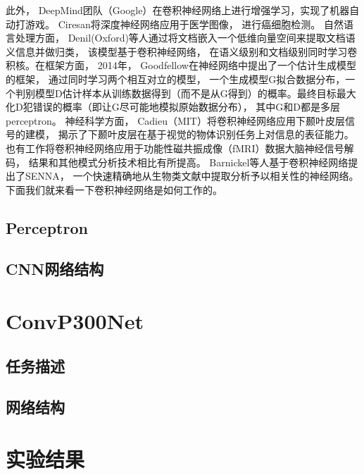 此外， DeepMind团队（Google）\cite{mnih2013playing}在卷积神经网络上进行增强学习，实现了机器自动打游戏。 Ciresan\cite{ciresan2013mitosis}将深度神经网络应用于医学图像， 进行癌细胞检测。  自然语言处理方面， Denil(Oxford)等人通过将文档嵌入一个低维向量空间来提取文档语义信息并做归类，  该模型基于卷积神经网络， 在语义级别和文档级别同时学习卷积核。在框架方面， 2014年， Goodfellow在神经网络中提出了一个估计生成模型的框架\cite{goodfellow2014generative}， 通过同时学习两个相互对立的模型， 一个生成模型G拟合数据分布，一个判别模型D估计样本从训练数据得到（而不是从G得到）的概率。最终目标最大化D犯错误的概率（即让G尽可能地模拟原始数据分布）， 其中G和D都是多层perceptron。 神经科学方面， Cadieu（MIT）将卷积神经网络应用下颞叶皮层信号的建模\cite{cadieu2014deep}， 揭示了下颞叶皮层在基于视觉的物体识别任务上对信息的表征能力。 也有工作将卷积神经网络应用于功能性磁共振成像（fMRI）数据大脑神经信号解码\cite{firat2014learning}， 结果和其他模式分析技术相比有所提高。 Barnickel等人基于卷积神经网络提出了SENNA， 一个快速精确地从生物类文献中提取分析予以相关性的神经网络\cite{barnickel2009large}。下面我们就来看一下卷积神经网络是如何工作的。


\subsection{Perceptron}

\subsection{CNN网络结构}\label{sec:cnn_arch}


\section{ConvP300Net}\label{sec:cnn_configure}

\subsection{任务描述}

\subsection{网络结构}

\section{实验结果}\label{sec:cnn_experiment}













